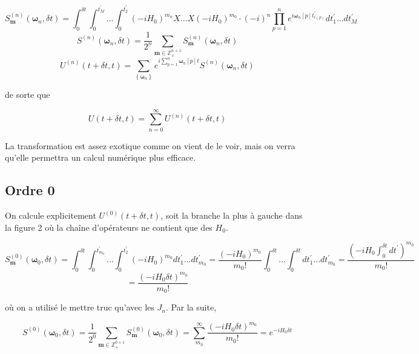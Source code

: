 \begin{equation}
    S^{(n)}_{\boldsymbol{m}}(\boldsymbol{\omega}_n, \delta t) = \int_{0}^{\delta t}\int_{0}^{t_M^{'}}...\int_{0}^{t_2^{'}} (-iH_0)^{m_n}X...X(-iH_0)^{m_0} \cdot (-i)^n \prod_{p=1}^{n}e^{i\boldsymbol{\omega}_n[p]t_{l(p)}^{'}} dt_1^{'} ... dt_M^{'}
\end{equation}
\begin{equation}
    S^{(n)}(\boldsymbol{\omega}_n, \delta t) = \frac{1}{2^n}\sum_{\boldsymbol{m} \in \mathbb{Z}^{n+1}_+} S^{(n)}_{\boldsymbol{m}}(\boldsymbol{\omega}_n, \delta t)
\end{equation}
\begin{equation}
    U^{(n)}(t + \delta t, t) = \sum_{\left\{\boldsymbol{\omega}_n\right\}}e^{i\sum_{p=1}^{n}\boldsymbol{\omega}_n[p]t}S^{(n)}(\boldsymbol{\omega}_n, \delta t)
\end{equation}

de sorte que 

\begin{equation}
    U(t+\delta t, t) = \sum_{n=0}^{\infty}U^{(n)}(t+\delta t, t)
\end{equation}

La transformation est assez exotique comme on vient de le voir, mais on verra qu'elle permettra un calcul numérique plus efficace.

\subsection{Ordre 0}
On calcule explicitement $U^{(0)}(t+\delta t, t)$, soit la branche la plus à gauche dans la figure 2 où la chaîne d'opérateurs ne contient que des $H_0$.

\begin{equation*}
    S^{(0)}_{\boldsymbol{m}}(\boldsymbol{\omega}_0, \delta t) = \int_{0}^{\delta t}\int_{0}^{t_{m_0}^{'}}...\int_{0}^{t_2^{'}} (-iH_0)^{m_0}dt_1^{'}...dt_{m_0}^{'} = \frac{(-iH_0)^{m_0}}{m_0!}\int_{0}^{\delta t}...\int_{0}^{\delta t}dt_1^{'}...dt_{m_0}^{'} = \frac{(-iH_0\int_{0}^{\delta t}dt^{'})^{m_0}}{m_0!}
\end{equation*}
\begin{equation*}
    = \frac{(-iH_0\delta t)^{m_0}}{m_0!}
\end{equation*}

où on a utilisé le mettre truc qu'avec les $J_n$. Par la suite,

\begin{equation*}
    S^{(0)}(\boldsymbol{\omega}_0, \delta t) = \frac{1}{2^0}\sum_{\boldsymbol{m} \in \mathbb{Z}^{0+1}_{+}}S^{(0)}_{\boldsymbol{m}}(\boldsymbol{\omega}_0, \delta t) = \sum_{m_0}^{\infty}\frac{(-iH_0\delta t)^{m_0}}{m_0!} = e^{-iH_0\delta t}
\end{equation*}

